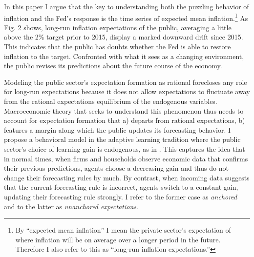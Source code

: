 \documentclass[11pt]{article}
\def \myFigPath {../../figures/}
\renewcommand{\[}{\begin{equation}}
\renewcommand{\]}{\end{equation}}
\def\mySmallFigScale{0.22}
\def\mySmallerFigScale{0.18}
\begin{document}
\begin{figure}[h!]
\caption{}
\label{urate_pce_ffr}
\end{figure}

In this paper I argue that the key to understanding both the puzzling behavior of inflation and the Fed's response is the time series of expected mean inflation.\footnote{By ``expected mean inflation'' I mean the private sector's expectation of where inflation will be on average over a longer period in the future. Therefore I also refer to this as ``long-run inflation expectations.''} As Fig. \ref{epi} shows, long-run inflation expectations of the public, averaging a little above the 2\% target prior to 2015, display a marked downward drift since 2015. This indicates that the public has doubts whether the Fed is able to restore inflation to the target. Confronted with what it sees as a changing environment, the public revises its predictions about the future course of the economy.

\begin{figure}[h!]
\caption{}
\label{epi}
\end{figure}

Modeling the public sector's expectation formation as rational forecloses any role for long-run expectations because it does not allow expectations to fluctuate away from the rational expectations equilibrium of the endogenous variables. Macroeconomic theory that seeks to understand this phenomenon thus needs to account for expectation formation that a) departs from rational expectations, b) features a margin along which the public updates its forecasting behavior. I propose a behavioral model in the adaptive learning tradition where the public sector's choice of learning gain is endogenous, as in \cite{carvalho2019anchored}. This captures the idea that in normal times, when firms and households observe economic data that confirms their previous predictions, agents choose a decreasing gain and thus do not change their forecasting rules by much. By contrast, when incoming data suggests that the current forecasting rule is incorrect, agents switch to a constant gain, updating their forecasting rule strongly. I refer to the former case as \emph{anchored} and to the latter as \emph{unanchored expectations}.
\end{document}
